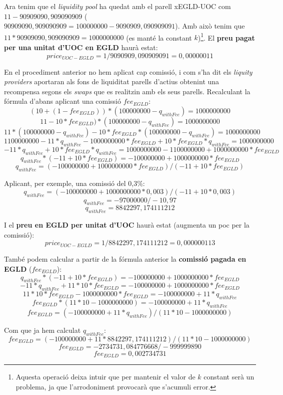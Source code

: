 \documentclass[11pt,a4paper]{article}
\begin{document}
Ara tenim que el \textit{liquidity pool} ha quedat amb el parell xEGLD-UOC com \(11-90909090,909090909\) (\(90909090,909090909=100000000-9090909,090909091\)). Amb això tenim que \(11 * 90909090,909090909 = 1000000000 \) (es manté la constant \(k\))\footnote{Aquesta operació deixa intuir que per mantenir el valor de \(k\) constant serà un problema, ja que l'arrodoniment provocarà que s'acumuli error.}. El \textbf{preu pagat per una unitat d'UOC en EGLD} haurà estat:
$$ price_{UOC-EGLD} = 1 / 9090909,090909091 = 0,00000011 $$

En el procediment anterior no hem aplicat cap comissió, i com s'ha dit els \textit{liquity providers} aportaran als fons de liquiditat parells d'actius obtenint una recompensa segons els \textit{swaps} que es realitzin amb els seus parells. Recalculant la fórmula d'abans aplicant una comissió \(fee_{EGLD}\):
$$ (10 + (1 - fee_{EGLD})) * (100000000 - q_{withFee}) = 1000000000 $$
$$ 11 - 10 * fee_{EGLD}) * (100000000 - q_{withFee}) = 1000000000 $$
$$ 11 * (100000000 - q_{withFee}) - 10 * fee_{EGLD} * (100000000 - q_{withFee}) = 1000000000 $$
$$ 1100000000 - 11 * q_{withFee} - 1000000000 * fee_{EGLD} + 10 * fee_{EGLD} * q_{withFee} = 1000000000 $$
$$ -11 * q_{withFee} + 10 * fee_{EGLD} * q_{withFee} = 1000000000 - 1100000000 + 1000000000 * fee_{EGLD} $$
$$ q_{withFee} * (-11 + 10 * fee_{EGLD}) = -100000000 + 1000000000 * fee_{EGLD} $$
$$ q_{withFee} = (-100000000 + 1000000000 * fee_{EGLD}) / (-11 + 10 * fee_{EGLD}) $$

Aplicant, per exemple, una comissió del 0,3\%:
$$ q_{withFee} = (-100000000 + 1000000000 * 0,003) / (-11 + 10 * 0,003) $$
$$ q_{withFee} = -97000000 / -10,97 $$
$$ q_{withFee} = 8842297,174111212 $$

I el \textbf{preu en EGLD per unitat d'UOC} haurà estat (augmenta un poc per la comissió):
$$ price_{UOC-EGLD} = 1 / 8842297,174111212 = 0,000000113 $$

També podem calcular a partir de la fórmula anterior la \textbf{comissió pagada en EGLD} (\(fee_{EGLD}\)):
$$ q_{withFee} * (-11 + 10 * fee_{EGLD}) = -100000000 + 1000000000 * fee_{EGLD} $$
$$ -11 * q_{withFee} + 11 * 10 * fee_{EGLD} = -100000000 + 1000000000 * fee_{EGLD} $$
$$ 11 * 10 * fee_{EGLD} - 1000000000 * fee_{EGLD} = -100000000 + 11 * q_{withFee} $$
$$ fee_{EGLD} * (11 * 10 - 1000000000) = -100000000 + 11 * q_{withFee} $$
$$ fee_{EGLD}= (-100000000 + 11 * q_{withFee}) / (11 * 10 - 1000000000) $$

Com que ja hem calculat \(q_{withFee}\):
$$ fee_{EGLD} = (-100000000 + 11 * 8842297,174111212) / (11 * 10 - 1000000000) $$
$$ fee_{EGLD} = -2734731,084776668 / -999999890 $$
$$ fee_{EGLD} = 0,002734731 $$
\end{document}
